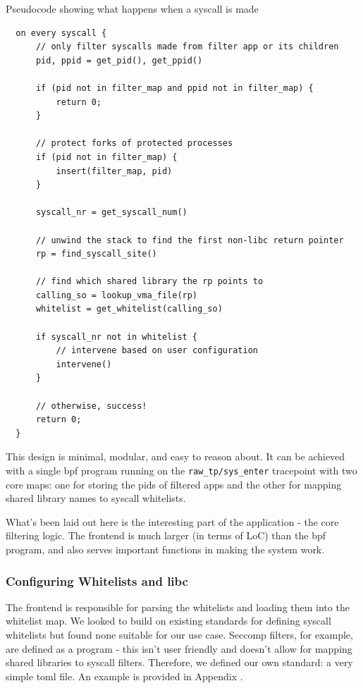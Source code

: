 
\begin{listing}[ht]
  \caption{Pseudocode showing what happens when a syscall is made}\label{lst:syscall-filter}
  \begin{verbatim}
  on every syscall {
      // only filter syscalls made from filter app or its children
      pid, ppid = get_pid(), get_ppid()

      if (pid not in filter_map and ppid not in filter_map) {
          return 0;
      }

      // protect forks of protected processes
      if (pid not in filter_map) {
          insert(filter_map, pid)
      }

      syscall_nr = get_syscall_num()

      // unwind the stack to find the first non-libc return pointer
      rp = find_syscall_site()

      // find which shared library the rp points to
      calling_so = lookup_vma_file(rp)
      whitelist = get_whitelist(calling_so)

      if syscall_nr not in whitelist {
          // intervene based on user configuration
          intervene()
      }

      // otherwise, success!
      return 0;
  }
  \end{verbatim}
\end{listing}

This design is minimal, modular, and easy to reason about. It can be achieved
with a single \ac{bpf} program running on the \texttt{raw\_tp/sys\_enter}
tracepoint with two core maps: one for storing the \acp{pid} of filtered apps
and the other for mapping shared library names to syscall whitelists.

What's been laid out here is the interesting part of the application
- the core filtering logic. The frontend is much larger (in terms of LoC) than
the \ac{bpf} program, and also serves important functions in making the system
work.

\subsubsection{Configuring Whitelists and \ac{libc}}

The frontend is responsible for parsing the \af whitelists and loading them into
the whitelist map. We looked to build on existing standards for defining
syscall whitelists but found none suitable for our use case. Seccomp filters,
for example, are defined as a  program - this isn't user friendly and
doesn't allow for mapping shared libraries to syscall filters. Therefore, we defined our
own standard: a very simple \ac{toml} file. An example is provided in Appendix
.

